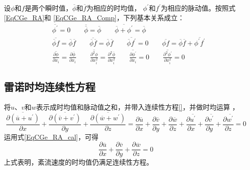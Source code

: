 设$\phi$和$f$是两个瞬时值，$\overline{\phi}$和$\overline{f}$为相应的时均值，
$\phi^{\prime}$和$f^{\prime}$为相应的脉动值。按照式\eqref{EqCGe_RA}和
\eqref{EqCGe_RA_Comp}，下列基本关系成立：
\begin{equation}
  \begin{aligned}
  &\overline{\phi^{\prime}} = 0
  \quad\quad
  \overline{\overline{\phi}} = \overline{\phi}
  \quad\quad
  \overline{\overline{\phi}+\phi^{\prime}} = \overline{\phi}
  \\
  & \overline{\overline{\phi}f} = \overline{\phi}\overline{f}
  \quad\quad
  \overline{\overline{\phi}\overline{f}} = \overline{\phi}\overline{f}
  \quad\quad
  \overline{\overline{\phi}f^{\prime}} = 0
  \quad\quad
  \overline{\phi f} = \overline{\phi}\overline{f} +
  \overline{\phi^{\prime}f^{\prime}}
  \\
  & \overline{\frac{\partial\phi}{\partial x_{i}}} = \frac{\partial \overline{\phi}}{\partial x_{i}}
  \quad\quad
  \overline{\frac{\partial^{2}\phi}{\partial x_{i}^{2}}} = \frac{\partial^{2}
  \overline{\phi}}{\partial x_{i}^{2}}
  \quad\quad
  \overline{\frac{\partial\phi^{\prime}}{\partial x_{i}}} = 0
  \quad\quad
  \overline{\frac{\partial^{2}\phi^{\prime}}{\partial x_{i}^{2}}} = 0
\end{aligned}
\label{EqCGe_RA_cal}
\end{equation}

\subsection{雷诺时均连续性方程}
将$u$、$v$和$w$表示成时均值和脉动值之和，并带入连续性方程\eqref{}，并做时均运算
，
\begin{equation*}
  \overline{
    \frac{\partial(\overline{u}+u^{\prime})}{\partial x} 
  }
  +
  \overline{
    \frac{\partial(\overline{v}+v^{\prime})}{\partial y} 
  }
  +
  \overline{
    \frac{\partial(\overline{w}+w^{\prime})}{\partial z} 
  }
  =
    \frac{\partial \overline{u}}{\partial x} +
    \frac{\partial \overline{v}}{\partial y} +
    \frac{\partial \overline{w}}{\partial z} +
    \frac{\partial \overline{u^{\prime}}}{\partial x} +
    \frac{\partial \overline{v^{\prime}}}{\partial y} +
    \frac{\partial \overline{w^{\prime}}}{\partial z}
    =0
\end{equation*}
运用式\eqref{EqCGe_RA_cal}，可得
\begin{equation}
    \frac{\partial \overline{u}}{\partial x} +
    \frac{\partial \overline{v}}{\partial y} +
    \frac{\partial \overline{w}}{\partial z}
    =
    0
\end{equation}
上式表明，紊流速度的时均值仍满足连续性方程。

